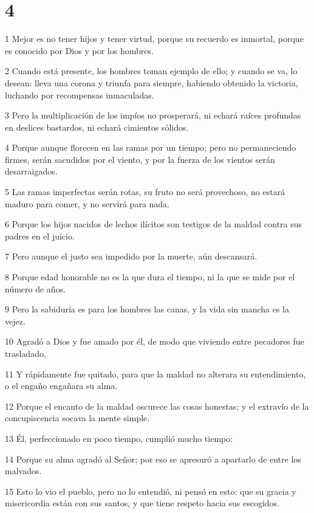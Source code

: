\chapter{4}

\par 1 Mejor es no tener hijos y tener virtud, porque su recuerdo es inmortal, porque es conocido por Dios y por los hombres.
\par 2 Cuando está presente, los hombres toman ejemplo de ello; y cuando se va, lo desean: lleva una corona y triunfa para siempre, habiendo obtenido la victoria, luchando por recompensas inmaculadas.
\par 3 Pero la multiplicación de los impíos no prosperará, ni echará raíces profundas en deslices bastardos, ni echará cimientos sólidos.
\par 4 Porque aunque florecen en las ramas por un tiempo; pero no permaneciendo firmes, serán sacudidos por el viento, y por la fuerza de los vientos serán desarraigados.
\par 5 Las ramas imperfectas serán rotas, su fruto no será provechoso, no estará maduro para comer, y no servirá para nada.
\par 6 Porque los hijos nacidos de lechos ilícitos son testigos de la maldad contra sus padres en el juicio.
\par 7 Pero aunque el justo sea impedido por la muerte, aún descansará.
\par 8 Porque edad honorable no es la que dura el tiempo, ni la que se mide por el número de años.
\par 9 Pero la sabiduría es para los hombres las canas, y la vida sin mancha es la vejez.
\par 10 Agradó a Dios y fue amado por él, de modo que viviendo entre pecadores fue trasladado.
\par 11 Y rápidamente fue quitado, para que la maldad no alterara su entendimiento, o el engaño engañara su alma.
\par 12 Porque el encanto de la maldad oscurece las cosas honestas; y el extravío de la concupiscencia socava la mente simple.
\par 13 Él, perfeccionado en poco tiempo, cumplió mucho tiempo:
\par 14 Porque su alma agradó al Señor; por eso se apresuró a apartarlo de entre los malvados.
\par 15 Esto lo vio el pueblo, pero no lo entendió, ni pensó en esto: que su gracia y misericordia están con sus santos, y que tiene respeto hacia sus escogidos.

